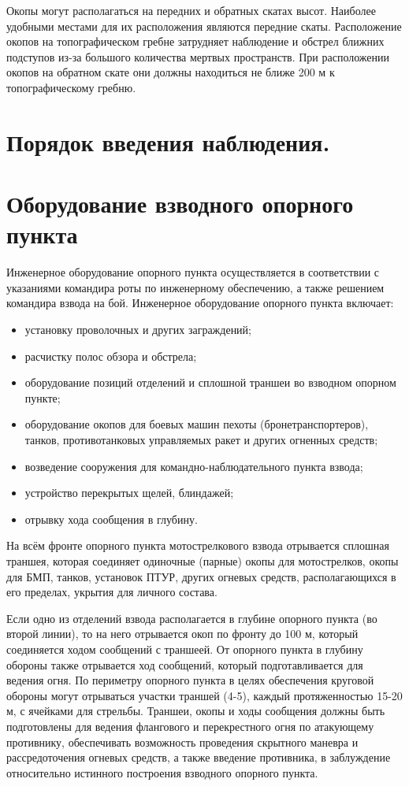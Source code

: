 \documentclass[12pt,a4paper]{report}
\begin{document}
Окопы могут располагаться на передних и обратных скатах высот. Наиболее удобными местами для их расположения являются передние скаты. Расположение окопов на топографическом гребне затрудняет наблюдение и обстрел ближних подступов из-за большого количества мертвых пространств. При расположении окопов на обратном скате они должны находиться не ближе 200 м к топографическому гребню.



\section{Порядок введения наблюдения.}




\section{Оборудование взводного опорного пункта}
   Инженерное оборудование опорного пункта осуществляется в соответствии с указаниями командира роты по инженерному обеспечению, а также решением командира взвода на бой.
   Инженерное оборудование опорного пункта включает:
   \begin{itemize}
   	\item  установку проволочных и других заграждений;
   	\item  расчистку полос обзора и обстрела;
   	\item оборудование позиций отделений и сплошной траншеи во взводном опорном пункте;
   	\item оборудование окопов для боевых машин пехоты (бронетранспортеров), танков, противотанковых управляемых ракет и других огненных средств;
   	\item возведение сооружения для командно-наблюдательного пункта взвода;
   	\item устройство перекрытых щелей, блиндажей;
   	\item отрывку хода сообщения в глубину.
   \end{itemize}
   

   На всём фронте опорного пункта мотострелкового взвода отрывается сплошная траншея, которая соединяет одиночные (парные) окопы для мотострелков, окопы для БМП, танков, установок ПТУР, других огневых средств, располагающихся в его пределах, укрытия для личного состава.
   
   Если одно из отделений взвода располагается в глубине опорного пункта (во второй линии), то на него отрывается окоп по фронту до 100 м, который соединяется ходом сообщений с траншеей. От опорного пункта в глубину обороны также отрывается ход сообщений, который подготавливается для ведения огня. По периметру опорного пункта в целях обеспечения круговой обороны могут отрываться участки траншей (4-5), каждый протяженностью 15-20 м, с ячейками для стрельбы. Траншеи, окопы и ходы сообщения должны быть подготовлены для ведения флангового и перекрестного огня по атакующему противнику, обеспечивать возможность проведения скрытного маневра и рассредоточения огневых средств, а также введение противника, в заблуждение относительно истинного построения взводного опорного пункта.
   
\end{document}
